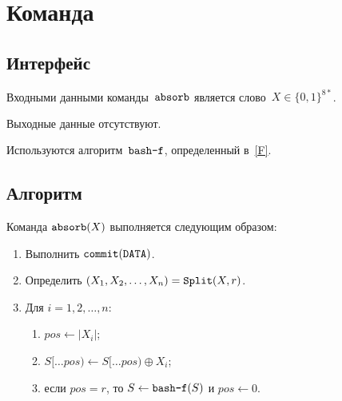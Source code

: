 \section{Команда }\label{PRG.Absorb}

\subsection{Интерфейс}\label{PRG.Absorb.IFace}

Входными данными команды~$\texttt{absorb}$ является слово~$X\in\{0,1\}^{8*}$.

Выходные данные отсутствуют.

Используются алгоритм~$\texttt{bash-f}$, определенный в~\ref{F}.

\subsection{Алгоритм}\label{PRG.Absorb.Alg}

Команда $\texttt{absorb}(X)$ выполняется следующим образом:
\begin{enumerate}
\item
Выполнить 
$\texttt{commit}(\texttt{DATA})$.
\item
Определить $(X_1,X_2,\ldots,X_n)=\mathop{\texttt{Split}}\nolimits(X,r)$.
\item
Для $i=1,2,\ldots,n$:
\begin{enumerate}
\item
$pos\leftarrow |X_i|$;
\item
$S[\dots pos)\leftarrow S[\dots pos)\oplus X_i$;
\item
если $pos=r$, то 
$S\leftarrow\texttt{bash-f}(S)$ и $pos\leftarrow 0$.
\end{enumerate}
\end{enumerate}

